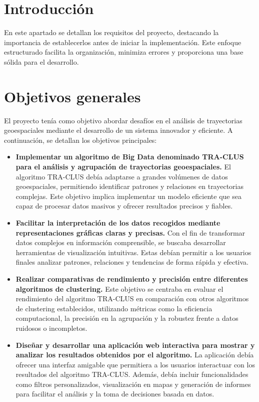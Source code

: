 
\section{Introducción}

En este apartado se detallan los requisitos del proyecto, destacando la importancia de establecerlos antes de iniciar la implementación. Este enfoque estructurado facilita la organización, minimiza errores y proporciona una base sólida para el desarrollo.

\section{Objetivos generales}

El proyecto tenía como objetivo abordar desafíos en el análisis de trayectorias geoespaciales mediante el desarrollo de un sistema innovador y eficiente. A continuación, se detallan los objetivos principales:

\begin{itemize}
    \item \textbf{Implementar un algoritmo de Big Data denominado TRA-CLUS para el análisis y agrupación de trayectorias geoespaciales.}  
    El algoritmo TRA-CLUS debía adaptarse a grandes volúmenes de datos geoespaciales, permitiendo identificar patrones y relaciones en trayectorias complejas. Este objetivo implica implementar un modelo eficiente que sea capaz de procesar datos masivos y ofrecer resultados precisos y fiables.

    \item \textbf{Facilitar la interpretación de los datos recogidos mediante representaciones gráficas claras y precisas.}  
    Con el fin de transformar datos complejos en información comprensible, se buscaba desarrollar herramientas de visualización intuitivas. Estas debían permitir a los usuarios finales analizar patrones, relaciones y tendencias de forma rápida y efectiva.

    \item \textbf{Realizar comparativas de rendimiento y precisión entre diferentes algoritmos de clustering.}  
    Este objetivo se centraba en evaluar el rendimiento del algoritmo TRA-CLUS en comparación con otros algoritmos de clustering establecidos, utilizando métricas como la eficiencia computacional, la precisión en la agrupación y la robustez frente a datos ruidosos o incompletos.

    \item \textbf{Diseñar y desarrollar una aplicación web interactiva para mostrar y analizar los resultados obtenidos por el algoritmo.}  
    La aplicación debía ofrecer una interfaz amigable que permitiera a los usuarios interactuar con los resultados del algoritmo TRA-CLUS. Además, debía incluir funcionalidades como filtros personalizados, visualización en mapas y generación de informes para facilitar el análisis y la toma de decisiones basada en datos.
\end{itemize}


